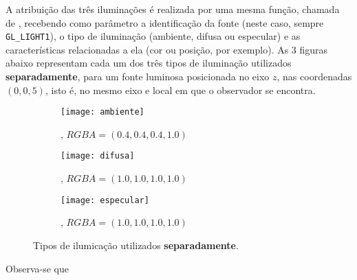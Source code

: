 \documentclass[12pt, a4paper]{article}
\begin{document}
A atribuição das três iluminações é realizada por uma mesma função, chamada de
, recebendo como parâmetro a identificação da fonte (neste
caso, sempre \texttt{GL\_LIGHT1}), o tipo de iluminação (ambiente, difusa ou
especular) e as características relacionadas a ela (cor ou posição, por
exemplo). As 3 figuras abaixo representam cada um dos três tipos de iluminação
utilizados \textbf{separadamente}, para um fonte luminosa posicionada no eixo
\(z\), nas coordenadas \((0, 0, 5)\), isto é, no mesmo eixo e local em que o
observador se encontra.

\FloatBarrier

\begin{figure}[h!]

\centering

\begin{subfigure}{.33\textwidth}
\centering
\texttt{[image: ambiente]}
\caption{\centering {}, \(RGBA = (0.4, 0.4, 0.4, 1.0 )\)}
\label{img:ambient}
\end{subfigure}%
\begin{subfigure}{.33\textwidth}
\centering
\texttt{[image: difusa]}
\caption{\centering {}, \(RGBA = (1.0, 1.0, 1.0, 1.0 )\)}
\label{img:diffuse}
\end{subfigure}
\begin{subfigure}{.33\textwidth}
\centering
\texttt{[image: especular]}
\caption{\centering {}, \(RGBA = (1.0, 1.0, 1.0, 1.0 )\)}
\label{img:specular}
\end{subfigure}


\caption{Tipos de ilumicação utilizados \textbf{separadamente}.}
\end{figure}

\FloatBarrier

Observa-se que 
\end{document}
